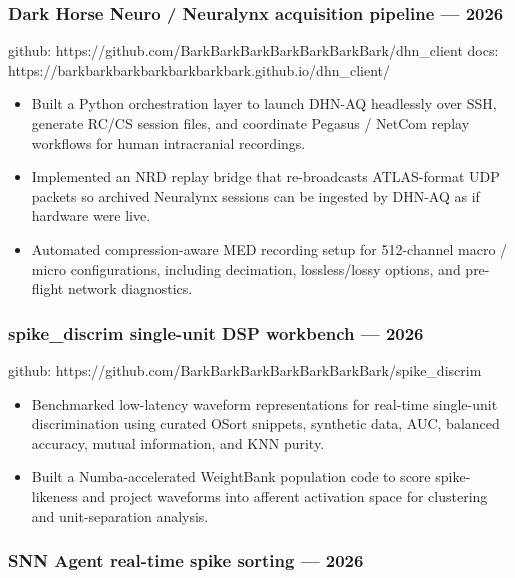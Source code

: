 \documentclass[11pt]{article}
\providecommand{\tightlist}{\setlength{\itemsep}{0pt}\setlength{\parskip}{0pt}}
\begin{document}
\subsubsection{Dark Horse Neuro / Neuralynx acquisition pipeline ---
2026}\label{dark-horse-neuro-neuralynx-acquisition-pipeline-2026}

github: https://github.com/BarkBarkBarkBarkBarkBarkBark/dhn\_client
docs: https://barkbarkbarkbarkbarkbarkbark.github.io/dhn\_client/

\begin{itemize}
\tightlist
\item
  Built a Python orchestration layer to launch DHN-AQ headlessly over
  SSH, generate RC/CS session files, and coordinate Pegasus / NetCom
  replay workflows for human intracranial recordings.
\item
  Implemented an NRD replay bridge that re-broadcasts ATLAS-format UDP
  packets so archived Neuralynx sessions can be ingested by DHN-AQ as if
  hardware were live.
\item
  Automated compression-aware MED recording setup for 512-channel macro
  / micro configurations, including decimation, lossless/lossy options,
  and pre-flight network diagnostics.
\end{itemize}

\subsubsection{spike\_discrim single-unit DSP workbench ---
2026}\label{spike_discrim-single-unit-dsp-workbench-2026}

github: https://github.com/BarkBarkBarkBarkBarkBarkBark/spike\_discrim

\begin{itemize}
\tightlist
\item
  Benchmarked low-latency waveform representations for real-time
  single-unit discrimination using curated OSort snippets, synthetic
  data, AUC, balanced accuracy, mutual information, and KNN purity.
\item
  Built a Numba-accelerated WeightBank population code to score
  spike-likeness and project waveforms into afferent activation space
  for clustering and unit-separation analysis.
\end{itemize}

\subsubsection{SNN Agent real-time spike sorting ---
2026}\label{snn-agent-real-time-spike-sorting-2026}
\end{document}
